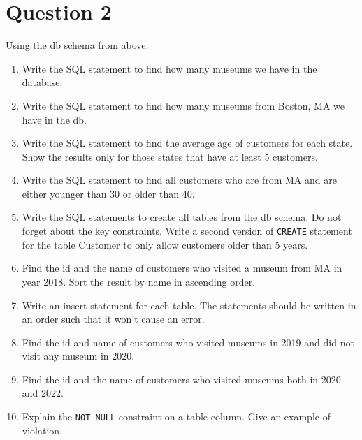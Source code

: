 \documentclass[letterpaper, 11pt]{article}
\begin{document}
\section*{Question 2}

Using the db schema from above:
\begin{enumerate}[leftmargin=*]
    \item Write the SQL statement to find how many museums we have in the database.
    \item Write the SQL statement to find how many museums from Boston, MA we have in the db.
    \item Write the SQL statement to find the average age of customers for each state. Show the results only for those states that have at least 5 customers.
    \item Write the SQL statement to find all customers who are from MA and are either younger than 30 or older than 40.
    \item Write the SQL statements to create all tables from the db schema. Do not forget about the key constraints. Write a second version of \texttt{CREATE} statement for the table Customer to only allow customers older than 5 years.
    \item Find the id and the name of customers who visited a museum from MA in year 2018. Sort the result by name in ascending order.
    \item Write an insert statement for each table. The statements should be written in an order such that it won’t cause an error.
    \item Find the id and name of customers who visited museums in 2019 and did not visit any museum in 2020.
    \item Find the id and the name of customers who visited museums both in 2020 and 2022.
    \item Explain the \texttt{NOT NULL} constraint on a table column. Give an example of violation.


\end{enumerate}
\end{document}
